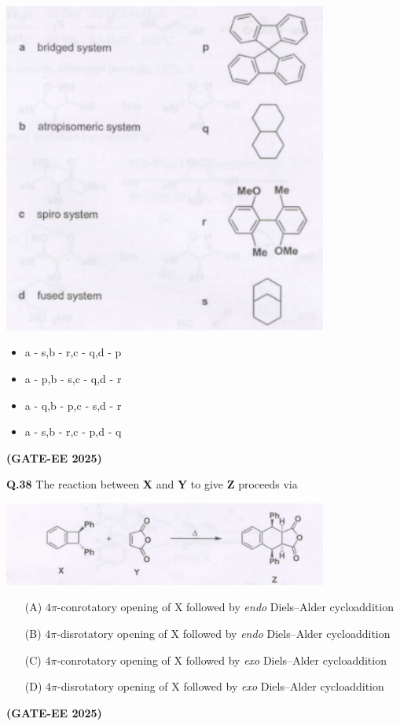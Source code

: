 \documentclass[12pt]{article}
\begin{document}
\begin{enumerate}
\begin{center}
    \includegraphics[width=0.8\textwidth]{q37.png}
\end{center}
\begin{itemize}
    \item a - s,\quad b - r,\quad c - q,\quad d - p
    \item a - p,\quad b - s,\quad c - q,\quad d - r
    \item a - q,\quad b - p,\quad c - s,\quad d - r
    \item a - s,\quad b - r,\quad c - p,\quad d - q
\end{itemize}   \textbf{(GATE-EE 2025)}


\textbf{Q.38} The reaction between \textbf{X} and \textbf{Y} to give \textbf{Z} proceeds via

\begin{center}
    \includegraphics[width=0.8\textwidth]{q38.png}
\end{center}
\begin{enumerate}
    \item [(A)]$4\pi$-conrotatory opening of X followed by \textit{endo} Diels--Alder cycloaddition
    \item [(B)]$4\pi$-disrotatory opening of X followed by \textit{endo} Diels--Alder cycloaddition
    \item [(C)]$4\pi$-conrotatory opening of X followed by \textit{exo} Diels--Alder cycloaddition
    \item [(D)] $4\pi$-disrotatory opening of X followed by \textit{exo} Diels--Alder cycloaddition
\end{enumerate}   \textbf{(GATE-EE 2025)}



\end{enumerate}
\end{document}
